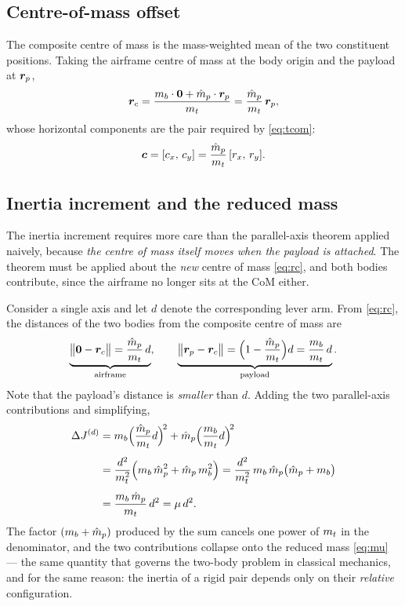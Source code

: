 \subsection{Centre-of-mass offset}\label{sec:model:com}

The composite centre of mass is the mass-weighted mean of the two
constituent positions. Taking the airframe centre of mass at the body
origin and the payload at $\bm{r}_p$,
\begin{equation}
\bm{r}_c = \frac{m_b \cdot \bm{0} + \hat{m}_p \cdot \bm{r}_p}{m_t}
= \frac{\hat{m}_p}{m_t}\, \bm{r}_p ,
\label{eq:rc}
\end{equation}
whose horizontal components are the pair required by \eqref{eq:tcom}:
\begin{equation}
\bm{c} = [c_x,\, c_y] = \frac{\hat{m}_p}{m_t}\, [r_x,\, r_y].
\label{eq:cxy}
\end{equation}

\subsection{Inertia increment and the reduced mass}\label{sec:model:paxis}

The inertia increment requires more care than the parallel-axis theorem
applied naively, because \emph{the centre of mass itself moves when the
payload is attached}. The theorem must be applied about the \emph{new}
centre of mass \eqref{eq:rc}, and both bodies contribute, since the
airframe no longer sits at the CoM either.

Consider a single axis and let $d$ denote the corresponding lever arm.
From \eqref{eq:rc}, the distances of the two bodies from the composite
centre of mass are
\begin{equation}
\underbrace{\bigl\| \bm{0} - \bm{r}_c \bigr\| = \frac{\hat{m}_p}{m_t}\, d}_{\text{airframe}},
\qquad
\underbrace{\bigl\| \bm{r}_p - \bm{r}_c \bigr\| = \Bigl( 1 - \frac{\hat{m}_p}{m_t} \Bigr) d = \frac{m_b}{m_t}\, d}_{\text{payload}} .
\label{eq:dists}
\end{equation}
Note that the payload's distance is \emph{smaller} than $d$. Adding the
two parallel-axis contributions and simplifying,
\begin{align}
\Delta J^{(d)}
&= m_b \Bigl( \frac{\hat{m}_p}{m_t} d \Bigr)^{\!2}
 + \hat{m}_p \Bigl( \frac{m_b}{m_t} d \Bigr)^{\!2} \nonumber \\[4pt]
&= \frac{d^2}{m_t^2}\Bigl( m_b\, \hat{m}_p^2 + \hat{m}_p\, m_b^2 \Bigr)
 = \frac{d^2}{m_t^2}\, m_b\, \hat{m}_p \bigl( \hat{m}_p + m_b \bigr) \nonumber \\[4pt]
&= \frac{m_b\, \hat{m}_p}{m_t}\, d^2
 = \mu\, d^2 .
\label{eq:reduced}
\end{align}
The factor $(m_b + \hat{m}_p)$ produced by the sum cancels one power of $m_t$
in the denominator, and the two contributions collapse onto the reduced
mass \eqref{eq:mu} --- the same quantity that governs the two-body
problem in classical mechanics, and for the same reason: the inertia of a
rigid pair depends only on their \emph{relative} configuration.

